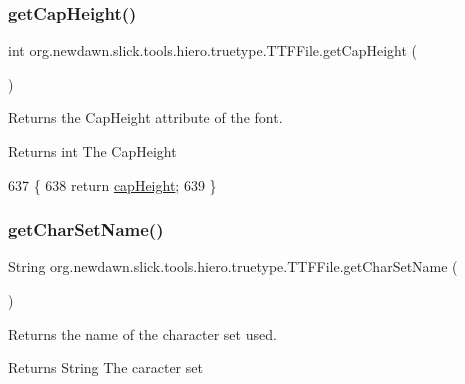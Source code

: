 \subsubsection{\texorpdfstring{get\+Cap\+Height()}{getCapHeight()}}
{\footnotesize\ttfamily int org.\+newdawn.\+slick.\+tools.\+hiero.\+truetype.\+T\+T\+F\+File.\+get\+Cap\+Height (\begin{DoxyParamCaption}{ }\end{DoxyParamCaption})\hspace{0.3cm}{\ttfamily [inline]}}

Returns the Cap\+Height attribute of the font. \begin{DoxyReturn}{Returns}
int The Cap\+Height 
\end{DoxyReturn}

\begin{DoxyCode}
637                               \{
638         \textcolor{keywordflow}{return} \mbox{\hyperlink{classorg_1_1newdawn_1_1slick_1_1tools_1_1hiero_1_1truetype_1_1_t_t_f_file_ab67a8ec96a9df5e61c316493705b9d1f}{capHeight}};
639     \}
\end{DoxyCode}
\mbox{\label{classorg_1_1newdawn_1_1slick_1_1tools_1_1hiero_1_1truetype_1_1_t_t_f_file_a886455e0575d902c5c7d7bc9bb35f965}} 
\subsubsection{\texorpdfstring{get\+Char\+Set\+Name()}{getCharSetName()}}
{\footnotesize\ttfamily String org.\+newdawn.\+slick.\+tools.\+hiero.\+truetype.\+T\+T\+F\+File.\+get\+Char\+Set\+Name (\begin{DoxyParamCaption}{ }\end{DoxyParamCaption})\hspace{0.3cm}{\ttfamily [inline]}}

Returns the name of the character set used. \begin{DoxyReturn}{Returns}
String The caracter set 
\end{DoxyReturn}

